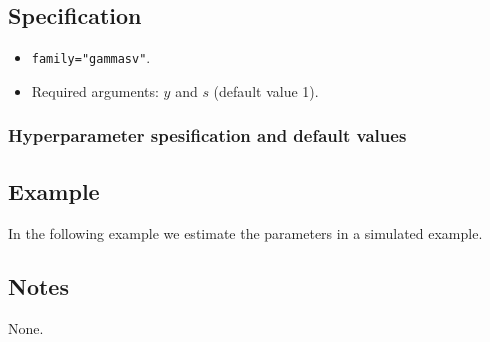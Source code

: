 \documentclass[a4paper,11pt]{article}
\begin{document}
\subsection*{Specification}

\begin{itemize}
\item \texttt{family="gammasv"}.
\item Required arguments: $y$ and $s$ (default value 1).
\end{itemize}

\subsubsection*{Hyperparameter spesification and default values}


\subsection*{Example}

In the following example we estimate the parameters in a simulated
example.


\subsection*{Notes}

None.
\end{document}
